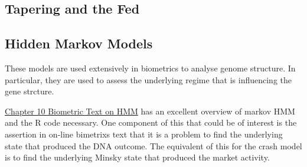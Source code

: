 \documentclass[12pt, a4paper, oneside]{article} %
\begin{document}
\subsection{Tapering and the Fed}

\subsection{Hidden Markov Models}
These models are used extensively in biometrics to analyse genome structure.  In particular, they are used to assess the underlying regime that is influencing the gene strcture. 

\href{http://a-little-book-of-r-for-bioinformatics.readthedocs.org/en/latest/src/chapter10.html}{Chapter 10 Biometric Text on HMM}
has an excellent overview of markov HMM and the R code necessary. One component of this that could be of interest is the assertion in on-line bimetrixs text that it is a problem to find the underlying state that produced the DNA outcome.  The equivalent of this for the crash model is to find the underlying Minsky state that produced the market activity. 
\end{document}
